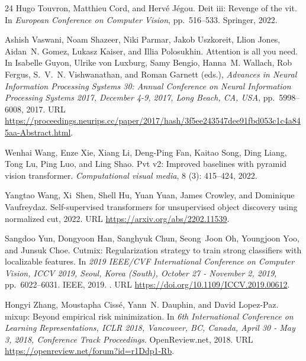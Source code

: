 \documentclass[10pt]{article} \usepackage[preprint]{tmlr}
\begin{document}
\begin{thebibliography}{24}
Hugo Touvron, Matthieu Cord, and Herv{\'e} J{\'e}gou.
\newblock Deit iii: Revenge of the vit.
\newblock In \emph{European Conference on Computer Vision}, pp.\  516--533.
  Springer, 2022.

Ashish Vaswani, Noam Shazeer, Niki Parmar, Jakob Uszkoreit, Llion Jones,
  Aidan~N. Gomez, Lukasz Kaiser, and Illia Polosukhin.
\newblock Attention is all you need.
\newblock In Isabelle Guyon, Ulrike von Luxburg, Samy Bengio, Hanna~M. Wallach,
  Rob Fergus, S.~V.~N. Vishwanathan, and Roman Garnett (eds.), \emph{Advances
  in Neural Information Processing Systems 30: Annual Conference on Neural
  Information Processing Systems 2017, December 4-9, 2017, Long Beach, CA,
  {USA}}, pp.\  5998--6008, 2017.
\newblock URL
  \url{https://proceedings.neurips.cc/paper/2017/hash/3f5ee243547dee91fbd053c1c4a845aa-Abstract.html}.

Wenhai Wang, Enze Xie, Xiang Li, Deng-Ping Fan, Kaitao Song, Ding Liang, Tong
  Lu, Ping Luo, and Ling Shao.
\newblock Pvt v2: Improved baselines with pyramid vision transformer.
\newblock \emph{Computational visual media}, 8 (3): 415--424,
  2022{}.

Yangtao Wang, Xi~Shen, Shell Hu, Yuan Yuan, James Crowley, and Dominique
  Vaufreydaz.
\newblock Self-supervised transformers for unsupervised object discovery using
  normalized cut, 2022{}.
\newblock URL \url{https://arxiv.org/abs/2202.11539}.

Sangdoo Yun, Dongyoon Han, Sanghyuk Chun, Seong~Joon Oh, Youngjoon Yoo, and
  Junsuk Choe.
\newblock Cutmix: Regularization strategy to train strong classifiers with
  localizable features.
\newblock In \emph{2019 {IEEE/CVF} International Conference on Computer Vision,
  {ICCV} 2019, Seoul, Korea (South), October 27 - November 2, 2019}, pp.\
  6022--6031. {IEEE}, 2019.
\newblock {}.
\newblock URL \url{https://doi.org/10.1109/ICCV.2019.00612}.

Hongyi Zhang, Moustapha Ciss{\'{e}}, Yann~N. Dauphin, and David Lopez{-}Paz.
\newblock mixup: Beyond empirical risk minimization.
\newblock In \emph{6th International Conference on Learning Representations,
  {ICLR} 2018, Vancouver, BC, Canada, April 30 - May 3, 2018, Conference Track
  Proceedings}. OpenReview.net, 2018.
\newblock URL \url{https://openreview.net/forum?id=r1Ddp1-Rb}.


\end{thebibliography}
\end{document}
